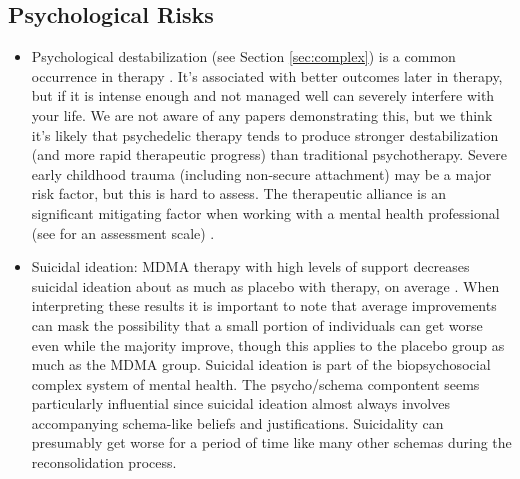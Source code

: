 \documentclass[12pt,letterpaper]{book}
\begin{document}
\subsection*{Psychological Risks}
\begin{itemize}
    \item Psychological destabilization (see Section \ref{sec:complex}) is a common occurrence in therapy \cite{olthofDestabilization}. It's associated with better outcomes later in therapy, but if it is intense enough and not managed well can severely interfere with your life. We are not aware of any papers demonstrating this, but we think it's likely that psychedelic therapy tends to produce stronger destabilization (and more rapid therapeutic progress) than traditional psychotherapy. Severe early childhood trauma (including non-secure attachment) may be a major risk factor, but this is hard to assess. The therapeutic alliance is an significant mitigating factor when working with a mental health professional (see \textcite{BRWAIdownload} for an assessment scale) \cite{fluckiger2018alliance}.
    \item Suicidal ideation: MDMA therapy with high levels of support decreases suicidal ideation about as much as placebo with therapy, on average \cite{mitchellMDMAClinicalTrial,mitchellMDMAClinicalTrial2}. When interpreting these results it is important to note that average improvements can mask the possibility that a small portion of individuals can get worse even while the majority improve, though this applies to the placebo group as much as the MDMA group. Suicidal ideation is part of the biopsychosocial complex system of mental health. The psycho/schema compontent seems particularly influential since suicidal ideation almost always involves accompanying schema-like beliefs and justifications. Suicidality can presumably get worse for a period of time like many other schemas during the reconsolidation process.

\end{itemize}
\end{document}
